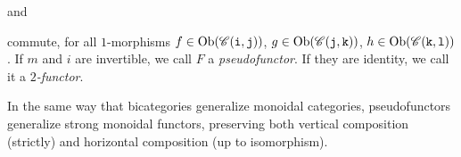 \begin{definition}
\begin{center}
\quad and \quad{}
\end{center}
\noindent commute, for all $1$-morphisms $f \in \textup{Ob}(\mathscr{C}(\textup{\texttt{i}}, \textup{\texttt{j}}))$, $g \in \textup{Ob}(\mathscr{C}(\textup{\texttt{j}}, \textup{\texttt{k}}))$, $h \in \textup{Ob}(\mathscr{C}(\textup{\texttt{k}}, \textup{\texttt{l}}))$. If $m$ and $i$ are invertible, we call $F$ a {\em pseudofunctor}. If they are identity, we call it a {\em $2$-functor}. 
\end{definition}

\noindent In the same way that bicategories generalize monoidal categories, pseudofunctors generalize strong monoidal functors, preserving both vertical composition (strictly) and horizontal composition (up to isomorphism).\\

